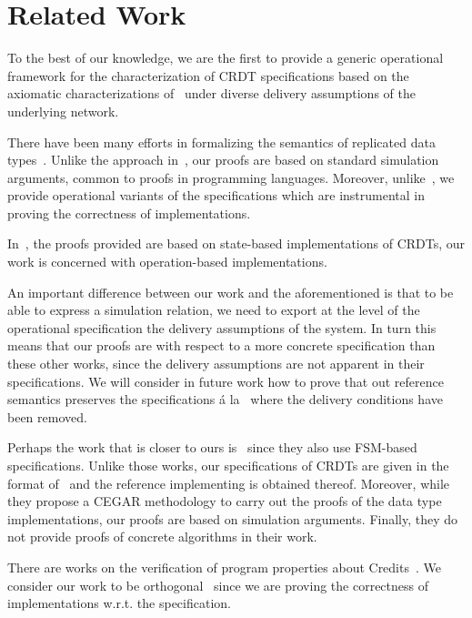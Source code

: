 \section{Related Work}
\label{sec:related-work}

To the best of our knowledge, we are the first to provide a generic
operational framework for the characterization of CRDT specifications
based on the axiomatic characterizations of~\cite{Burckhardt:2014}
under diverse delivery assumptions of the underlying network.
%

There have been many efforts in formalizing the semantics of
replicated data
types~\cite{Burckhardt:2014,Burckhardt:2014b,ZellerBP14,MukundRS15}.
%
Unlike the approach in~\cite{Burckhardt:2014,Burckhardt:2014b}, our
proofs are based on standard simulation arguments, common to proofs in
programming languages.
%
Moreover, unlike~\cite{Burckhardt:2014,Burckhardt:2014b}, we provide
operational variants of the specifications which are instrumental in
proving the correctness of implementations.

In~\cite{ZellerBP14}, the proofs provided are based on state-based
implementations of CRDTs, our work is concerned with operation-based
implementations.

An important difference between our work and the aforementioned is
that to be able to express a simulation relation, we need to export at
the level of the operational specification the delivery assumptions of
the system.
%
In turn this means that our proofs are with respect to a more concrete
specification than these other works, since the delivery assumptions
are not apparent in their specifications.
%
We will consider in future work how to prove that out reference
semantics preserves the specifications \'a la~\cite{Burckhardt:2014}
where the delivery conditions have been removed.
%

Perhaps the work that is closer to ours is~\cite{MukundRS15,MukundRS15b} 
since they also use FSM-based specifications. 
Unlike those works, our specifications of CRDTs are given in the
format of~\cite{Burckhardt:2014} and the reference implementing is
obtained thereof.
%
Moreover, while they propose a CEGAR methodology to carry out the
proofs of the data type implementations, our proofs are based on
simulation arguments.
%
Finally, they do not provide proofs of concrete algorithms in their
work. 

There are works on the verification of program properties about
Credits~\cite{GotsmanYFNS16}.
%
We consider our work to be orthogonal~\cite{GotsmanYFNS16} since we
are proving the correctness of implementations w.r.t. the
specification. 

